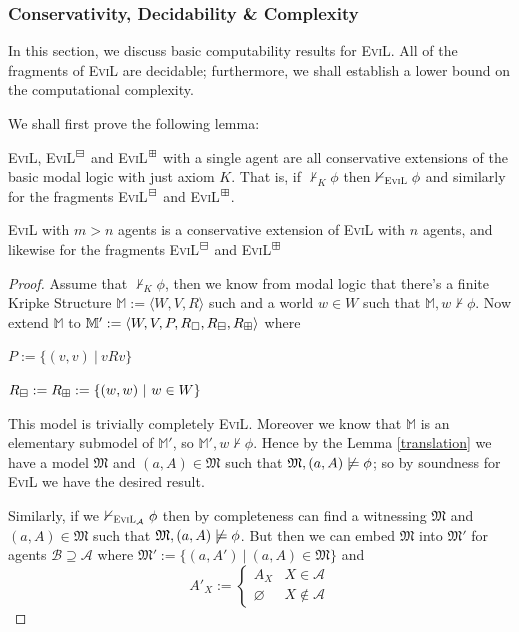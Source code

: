 \subsubsection{Conservativity, Decidability \& Complexity}

In this section, we discuss basic computability results for
\textsc{EviL}. All of the fragments of \textsc{EviL} are decidable;
furthermore, we shall establish a lower bound on the computational complexity.

We shall first prove the following lemma:

\begin{lemma}
\textsc{EviL}, \textsc{EviL}$^\boxminus$ and \textsc{EviL}$^\boxplus$ with a single agent are all conservative extensions of the basic modal logic with just axiom $K$.  That is, if $\nvdash_K \phi$ then $\nvdash_{\textup{\textsc{EviL}}} \phi$ and similarly for the fragments \textsc{EviL}$^\boxminus$ and \textsc{EviL}$^\boxplus$.

\textsc{EviL} with $m > n$ agents is a conservative extension of \textsc{EviL} with $n$ agents, and likewise for the fragments \textsc{EviL}$^\boxminus$ and \textsc{EviL}$^\boxplus$ 
\end{lemma}
\begin{proof}
Assume that $\nvdash_K \phi$, then we know from modal logic that there's a finite Kripke Structure $\mathbb{M} := \langle W, V, R\rangle$ such and a world $w \in W$ such that $\mathbb{M},w \nvdash \phi$.  Now extend $\mathbb{M}$ to $\mathbb{M}' := \langle W, V, P, R_\Box, R_\boxminus, R_\boxplus \rangle$ where
\begin{bul}
	\item $P := \{(v,v)\ |\ v R v\}$
	\item $R_\boxminus := R_\boxplus := \{(w,w)\ |\ w \in W\}$
\end{bul}
This model is trivially completely \textsc{EviL}. Moreover we know that $\mathbb{M}$ is an elementary submodel of $\mathbb{M}'$, so $\mathbb{M}', w\nvdash \phi$.  Hence by the Lemma \ref{translation} we have a model $\mathfrak{M}$ and $(a,A) \in \mathfrak{M}$ such that $\mathfrak{M},(a,A) \not\models \phi$; so by soundness for \textsc{EviL} we have the desired result.

Similarly, if we $\nvdash_{\textup{\textsc{EviL}}_\mathcal{A}} \phi$ then by completeness can find a witnessing $\mathfrak{M}$ and $(a,A) \in \mathfrak{M}$ such that $\mathfrak{M},(a,A) \not\models \phi$.  But then we can embed $\mathfrak{M}$ into $\mathfrak{M}'$ for agents $\mathcal{B} \supseteq \mathcal{A}$ where $\mathfrak{M}' := \{(a,A') \ |\ (a,A) \in \mathfrak{M}\}$ and
$$ A'_X := \begin{cases} A_X & X \in\mathcal{A} \\ \varnothing & X \nin \mathcal{A}\end{cases} $$
\end{proof}


